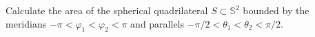 
\begin{exercise}
\label{ex:spherical_quadrilateral_area}
Calculate the area of the spherical quadrilateral $S \subset \mathbb{S}^2$ bounded by the
meridians $-\pi < \varphi_1 < \varphi_2 < \pi$ and parallels $-\pi/2 < \theta_1 < \theta_2 <
\pi/2$.
\end{exercise}


